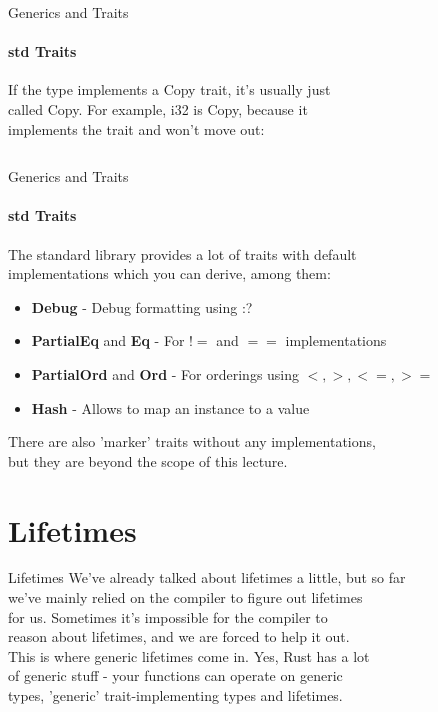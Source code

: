 \documentclass[usenames,dvipsnames,10pt,aspectratio=169]{beamer}
\begin{document}
\begin{frame}{Generics and Traits}
	\framesubtitle{std Traits}
	\large
	If the type implements a \textcolor{ucuyellow}{Copy} trait, it's usually just\\
	called Copy. For example, i32 is Copy, because it\\
	implements the trait and won't move out:\\
	\vspace{0.2cm}
	\inputminted[fontsize=\normalsize]{rust}{code/traits7.rs}
\end{frame}

\begin{frame}{Generics and Traits}
	\framesubtitle{std Traits}
	\large
	The standard library provides a lot of traits with default\\
	implementations which you can derive, among them:\\
	\vspace{0.2cm}
	\begin{itemize}[label=$\bullet$]
		\item \textbf{Debug} - Debug formatting using :?
		\item \textbf{PartialEq} and \textbf{Eq} - For $!=$ and $==$ implementations
		\item \textbf{PartialOrd} and \textbf{Ord} - For orderings using $<, >, <=, >=$
		\item \textbf{Hash} - Allows to map an instance to a value
	\end{itemize}
	\vspace{0.5cm}
	There are also 'marker' traits without any implementations,\\
	but they are beyond the scope of this lecture.\\
\end{frame}


\section{Lifetimes}
\begin{frame}{Lifetimes}
	\large
	We've already talked about lifetimes a little, but so far\\
	we've mainly relied on the compiler to figure out lifetimes\\
	for us. Sometimes it's impossible for the compiler to\\
	reason about lifetimes, and we are forced to help it out.\\
	\vspace{0.4cm}
	This is where generic lifetimes come in. Yes, Rust has a lot\\
	of generic stuff - your functions can operate on generic\\
	types, 'generic' trait-implementing types and lifetimes.
\end{frame}
\end{document}
